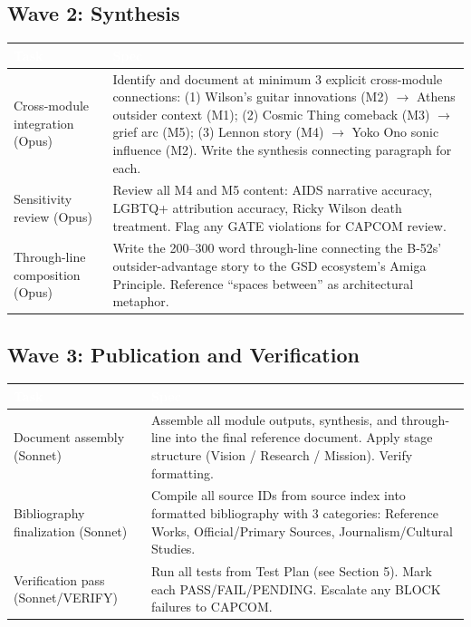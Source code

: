 \documentclass[11pt,letterpaper]{article}
\newcommand{\tableheader}[1]{\textbf{\sffamily\textcolor{white}{#1}}}
\begin{document}
\subsection{Wave 2: Synthesis}

\begin{center}
\begin{tabularx}{\textwidth}{L{3cm}X}
\toprule
{}
\tableheader{Task} & \tableheader{Spec} \\
\midrule
Cross-module integration (Opus) & Identify and document at minimum 3 explicit cross-module connections: (1) Wilson's guitar innovations (M2) \(\rightarrow\) Athens outsider context (M1); (2) Cosmic Thing comeback (M3) \(\rightarrow\) grief arc (M5); (3) Lennon story (M4) \(\rightarrow\) Yoko Ono sonic influence (M2). Write the synthesis connecting paragraph for each. \\
Sensitivity review (Opus) & Review all M4 and M5 content: AIDS narrative accuracy, LGBTQ+ attribution accuracy, Ricky Wilson death treatment. Flag any GATE violations for CAPCOM review. \\
Through-line composition (Opus) & Write the 200--300 word through-line connecting the B-52s' outsider-advantage story to the GSD ecosystem's Amiga Principle. Reference ``spaces between'' as architectural metaphor. \\
\bottomrule
\end{tabularx}
\end{center}

\subsection{Wave 3: Publication and Verification}

\begin{center}
\begin{tabularx}{\textwidth}{L{3cm}X}
\toprule
{}
\tableheader{Task} & \tableheader{Spec} \\
\midrule
Document assembly (Sonnet) & Assemble all module outputs, synthesis, and through-line into the final reference document. Apply stage structure (Vision / Research / Mission). Verify formatting. \\
Bibliography finalization (Sonnet) & Compile all source IDs from source index into formatted bibliography with 3 categories: Reference Works, Official/Primary Sources, Journalism/Cultural Studies. \\
Verification pass (Sonnet/VERIFY) & Run all tests from Test Plan (see Section 5). Mark each PASS/FAIL/PENDING. Escalate any BLOCK failures to CAPCOM. \\
\bottomrule
\end{tabularx}
\end{center}
\end{document}
